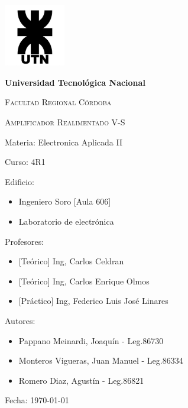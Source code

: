 \documentclass[12pt, letterpaper]{article}
\begin{document}
\begin{titlepage}
	\centering %
	{\includegraphics[width=0.2\textwidth]{Imagenes/UTN_logo.jpg}\par}
	{\bfseries\LARGE Universidad Tecnológica Nacional \par}
	{\scshape\Large Facultad Regional Córdoba\par}
	\vspace{1cm}
	{\scshape\Huge Amplificador Realimentado V-S \par}%
	\raggedright %
	\vspace{1cm}
	{\Large Materia: Electronica Aplicada II \par}%
	\vspace{0.5cm}
	{\Large Curso: 4R1 \par}
	\vspace{0.5cm}
	{\Large Edificio: \par}%
	\begin{itemize}
		\item{\Large Ingeniero Soro [Aula 606] \par}
		\item{\Large Laboratorio de electrónica \par}
	\end{itemize}
	\vspace{0.5cm}
	{\Large Profesores: \par} %
	\begin{itemize}
		\item{\Large [Teórico] Ing, Carlos Celdran \par}
		\item{\Large [Teórico] Ing, Carlos Enrique Olmos \par}
		\item{\Large [Práctico] Ing, Federico Luis José Linares \par}
	\end{itemize}
	\vspace{0.5cm}
	{\Large Autores: \par} %
	\begin{itemize}
		\item{\Large Pappano Meinardi, Joaquín - Leg.86730\par}
		\item{\Large Monteros Vigueras, Juan Manuel - Leg.86334\par}
		\item{\Large Romero Diaz, Agustín - Leg.86821\par}
	\end{itemize}
	\vspace{0.5cm}
	{\Large Fecha: {\today} \par}%
\end{titlepage}
\end{document}
